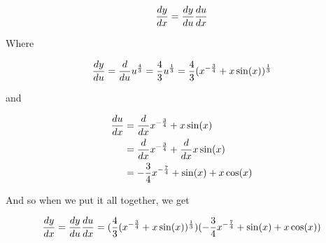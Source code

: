 \documentclass[12pt]{article} %
\begin{document}
\begin{homeworkProblem}
    $$
        \frac{dy}{dx} = \frac{dy}{du} \frac{du}{dx}
    $$

    Where

    $$
        \frac{dy}{du} = \frac{d}{du} u^{\frac{4}{3}} = \frac{4}{3} u^{\frac{1}{3}} = \frac{4}{3} (x^{-\frac{3}{4}}+ x\sin(x))^{\frac{1}{3}}
    $$

    and

    \begin{align*}
        \frac{du}{dx}
         & = \frac{d}{dx} x^{-\frac{3}{4}} + x\sin(x)             \\
         & = \frac{d}{dx} x^{-\frac{3}{4}} +\frac{d}{dx}  x\sin(x) \\
         & = - \frac{3}{4} x^{-\frac{7}{4}} + \sin(x) + x\cos(x)
    \end{align*}

    And so when we put it all together, we get

    $$
        \frac{dy}{dx} = \frac{dy}{du} \frac{du}{dx} = (\frac{4}{3} (x^{-\frac{3}{4}}+ x\sin(x))^{\frac{1}{3}}) (- \frac{3}{4} x^{-\frac{7}{4}} + \sin(x) + x\cos(x))
    $$
\end{homeworkProblem}
\pagebreak
\end{document}
